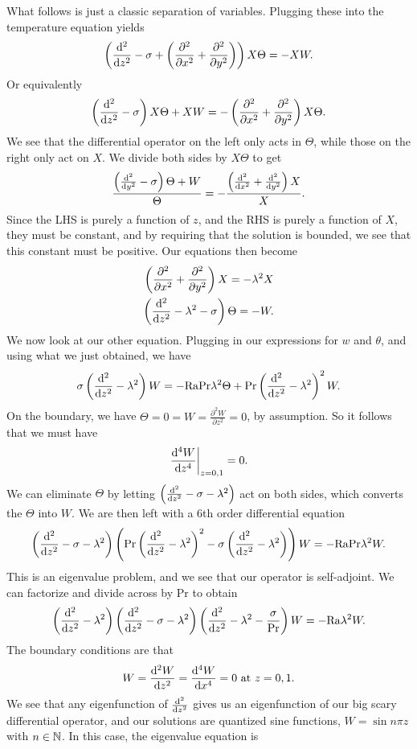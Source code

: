 \documentclass[a4paper]{article}
\newcommand\Ra{\mathrm{Ra}}
\renewcommand\Pr{\mathrm{Pr}}
\begin{document}
What follows is just a classic separation of variables. Plugging these into the temperature equation yields
\[
  \left(\frac{\mathrm{d}^2}{\mathrm{d} z^2} - \sigma + \left(\frac{\partial^2}{\partial x^2} + \frac{\partial^2}{\partial y^2}\right)\right) X \Theta = -XW.
\]
Or equivalently
\[
  \left(\frac{\mathrm{d}^2}{\mathrm{d} z^2} - \sigma\right) X\Theta + XW = - \left(\frac{\partial^2}{\partial x^2} + \frac{\partial^2}{\partial y^2}\right) X\Theta.
\]
We see that the differential operator on the left only acts in $\Theta$, while those on the right only act on $X$. We divide both sides by $X\Theta$ to get
\[
  \frac{\left(\frac{\mathrm{d}^2}{\mathrm{d} y^2} - \sigma\right) \Theta + W}{\Theta} = - \frac{\left(\frac{\mathrm{d}^2}{\mathrm{d} x^2} + \frac{\mathrm{d}^2}{\mathrm{d} y^2}\right) X}{X}.
\]
Since the LHS is purely a function of $z$, and the RHS is purely a function of $X$, they must be constant, and by requiring that the solution is bounded, we see that this constant must be positive. Our equations then become
\begin{align*}
  \left(\frac{\partial^2}{\partial x^2} + \frac{\partial^2}{\partial y^2} \right)X = - \lambda^2 X\\
  \left(\frac{\mathrm{d}^2}{\mathrm{d} z^2} - \lambda^2 - \sigma\right) \Theta = - W.
\end{align*}
We now look at our other equation. Plugging in our expressions for $w$ and $\theta$, and using what we just obtained, we have
\[
  \sigma\left(\frac{\d^2}{\d z^2} - \lambda^2 \right)W = - \Ra \Pr \lambda^2 \Theta + \Pr \left(\frac{\d^2}{\d z^2} - \lambda^2\right)^2 W.
\]
On the boundary, we have $\Theta = 0 = W = \frac{\partial^2 W}{\partial z^2} = 0$, by assumption. So it follows that we must have
\[
  \left.\frac{\mathrm{d}^4W}{\mathrm{d} z^4} \right|_{z = 0, 1} = 0.
\]
We can eliminate $\Theta$ by letting $\left(\frac{\mathrm{d}^2}{\mathrm{d} z^2} - \sigma - \lambda^2\right)$ act on both sides, which converts the $\Theta$ into $W$. We are then left with a $6$th order differential equation
\[
  \left(\frac{\d^2}{\d z^2} - \sigma - \lambda^2\right) \left(\Pr \left(\frac{\d^2}{\d z^2} - \lambda^2\right)^2 - \sigma \left(\frac{\d^2}{\d z^2} - \lambda^2\right)\right) W =- \Ra \Pr \lambda^2 W.
\]
This is an eigenvalue problem, and we see that our operator is self-adjoint. We can factorize and divide across by $\Pr$ to obtain
\[
  \left(\frac{\d^2}{\d z^2} - \lambda^2 \right) \left(\frac{\d^2}{\d z^2} - \sigma - \lambda^2\right) \left(\frac{\d^2}{\d z^2} - \lambda ^2 - \frac{\sigma}{\Pr}\right) W = - \Ra \lambda^2 W.
\]
The boundary conditions are that
\[
  W= \frac{\mathrm{d}^2 W}{\mathrm{d} z^2}= \frac{\mathrm{d}^4 W}{\mathrm{d} x^4} = 0\text{ at }z = 0, 1.
\]
We see that any eigenfunction of $\frac{\mathrm{d}^2}{\mathrm{d} z^2}$ gives us an eigenfunction of our big scary differential operator, and our solutions are quantized sine functions, $W = \sin n \pi z$ with $n \in \mathbb{N}$. In this case, the eigenvalue equation is
\end{document}
